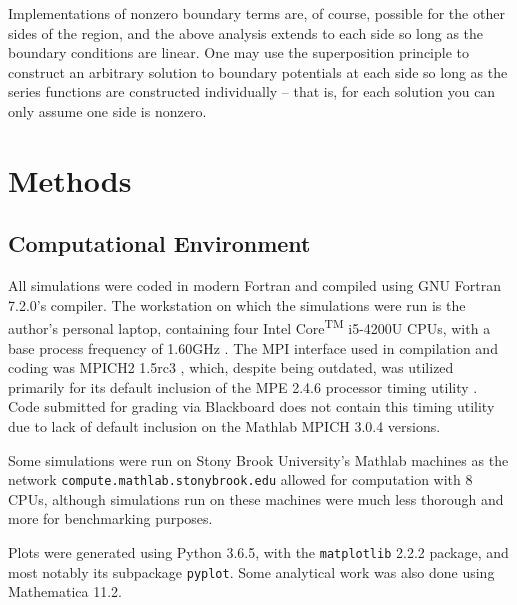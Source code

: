 \documentclass[reprint, amsmath, amssymb, aps, floatfix]{revtex4-1}
\def\inline{\lstinline[basicstyle=\ttfamily,keywordstyle={}]}
\begin{document}
Implementations of nonzero boundary terms are, of course, possible for the other sides of the region, and the above analysis extends to each side so long as the boundary conditions are linear. One may use the superposition principle to construct an arbitrary solution to boundary potentials at each side so long as the series functions are constructed individually -- that is, for each solution you can only assume one side is nonzero.

\section{Methods}

\subsection{Computational Environment}

All simulations were coded in modern Fortran and compiled using GNU Fortran 7.2.0's compiler. The workstation on which the simulations were run is the author's personal laptop, containing four Intel\textsuperscript{\textregistered}  Core\textsuperscript{TM} i5-4200U CPUs, with a base process frequency of 1.60GHz \cite{intel}. The MPI interface used in compilation and coding was MPICH2 1.5rc3 \cite{mpich}, which, despite being outdated, was utilized primarily for its default inclusion of the MPE 2.4.6 processor timing utility \cite{mpe}. Code submitted for grading via Blackboard does not contain this timing utility due to lack of default inclusion on the Mathlab MPICH 3.0.4 versions.

Some simulations were run on Stony Brook University's Mathlab machines as the network \inline{compute.mathlab.stonybrook.edu} allowed for computation with 8 CPUs, although simulations run on these machines were much less thorough and more for benchmarking purposes. 

Plots were generated using Python 3.6.5, with the \inline{matplotlib} 2.2.2 package, and most notably its subpackage \inline{pyplot}. Some analytical work was also done using Mathematica 11.2.







\end{document}
